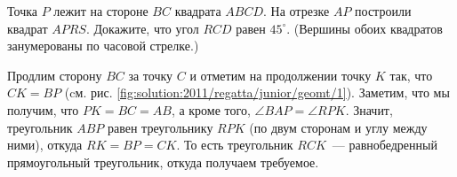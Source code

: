 Точка $P$ лежит на стороне $BC$ квадрата $ABCD$.
На отрезке $AP$ построили квадрат $APRS$.
Докажите, что угол $RCD$ равен $45^\circ$.
(Вершины обоих квадратов занумерованы по часовой стрелке.)



%
\label{solution:2011/regatta/junior/geomt/1}%
Продлим сторону $BC$ за точку $C$ и отметим на продолжении точку $K$ так, что
$C K = B P$
(cм. рис. \ref{fig:solution:2011/regatta/junior/geomt/1}).
Заметим, что мы получим, что $PK = BC = AB$, а кроме того,
$\angle BAP = \angle RPK$.
Значит, треугольник $ABP$ равен треугольнику $RPK$
(по двум сторонам и углу между ними),
откуда $RK = BP = CK$.
То есть треугольник $RCK$~--- равнобедренный прямоугольный треугольник, откуда
получаем требуемое.

